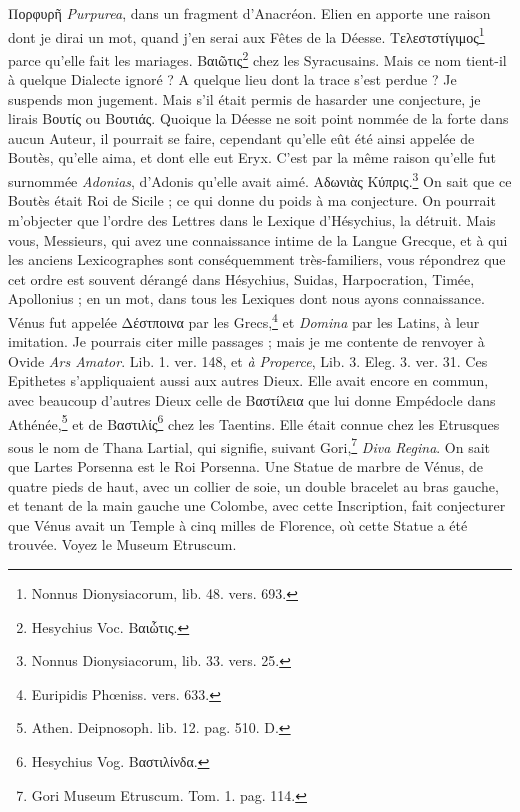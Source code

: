 \documentclass[a4paper, 11pt, oneside, polutonikogreek, french]{article}
\begin{document}
Πορφυρῆ \emph{Purpurea}, dans un fragment d'Anacréon. Elien en apporte une raison dont je dirai un mot, quand j'en serai aux Fêtes de la Déesse. Τελεστστίγιμος\footnote{Nonnus Dionysiacorum, lib. 48. vers. 693.} parce qu'elle fait les mariages. Βαιῶτις\footnote{Hesychius Voc. Βαιὧτις.} chez les Syracusains. Mais ce nom tient-il à quelque Dialecte ignoré ? A quelque lieu dont la trace s'est perdue ? Je suspends mon jugement. Mais s'il était permis de hasarder une conjecture, je lirais Βουτίς ou Βουτιάς. Quoique la Déesse ne soit point nommée de la forte dans aucun Auteur, il pourrait se faire, cependant qu'elle eût été ainsi appelée de Boutès, qu'elle aima, et dont elle eut Eryx. C'est par la même raison qu'elle fut surnommée \emph{Adonias}, d'Adonis qu'elle avait aimé. Αδωνιὰς Κύπρις.\footnote{Nonnus Dionysiacorum, lib. 33. vers. 25.} On sait que ce Boutès était Roi de Sicile ; ce qui donne du poids à ma conjecture. On pourrait m'objecter que l'ordre des Lettres dans le Lexique d'Hésychius, la détruit. Mais vous, Messieurs, qui avez une connaissance intime de la Langue Grecque, et à qui les anciens Lexicographes sont conséquemment très-familiers, vous répondrez que cet ordre est souvent dérangé dans Hésychius, Suidas, Harpocration, Timée, Apollonius ; en un mot, dans tous les Lexiques dont nous ayons connaissance. Vénus fut appelée Δέστποινα par les Grecs,\footnote{Euripidis Phœniss. vers. 633.} et \emph{Domina} par les Latins, à leur imitation. Je pourrais citer mille passages ; mais je me contente de renvoyer à Ovide \emph{Ars Amator}. Lib. 1. ver. 148, et \emph{à Properce}, Lib. 3. Eleg. 3. ver. 31. Ces Epithetes s'appliquaient aussi aux autres Dieux. Elle avait encore en commun, avec beaucoup d'autres Dieux celle de Βαστίλεια que lui donne Empédocle dans Athénée,\footnote{Athen. Deipnosoph. lib. 12. pag. 510. D.} et de Βαστιλίς\footnote{Hesychius Vog. Βαστιλίνδα.} chez les Taentins. Elle était connue chez les Etrusques sous le nom de Thana Lartial, qui signifie, suivant Gori,\footnote{Gori Museum Etruscum. Tom. 1. pag. 114.} \emph{Diva Regina}. On sait que Lartes Porsenna est le Roi Porsenna. Une Statue de marbre de Vénus, de quatre pieds de haut, avec un collier de soie, un double bracelet au bras gauche, et tenant de la main gauche une Colombe, avec cette Inscription, fait conjecturer que Vénus avait un Temple à cinq milles de Florence, où cette Statue a été trouvée. Voyez le Museum Etruscum.
\end{document}
